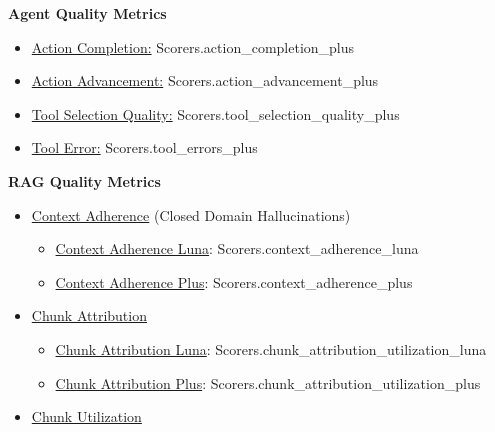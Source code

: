 \documentclass[
  letterpaper,
  DIV=11,
  numbers=noendperiod,
  oneside]{scrreprt}
\begin{document}
\begin{tcolorbox}
\textbf{Agent Quality Metrics}

\begin{itemize}
\item
  \href{https://docs.galileo.ai/galileo/gen-ai-studio-products/galileo-guardrail-metrics/action-completion}{Action
  Completion:} Scorers.action\_completion\_plus
\item
  \href{https://docs.galileo.ai/galileo/gen-ai-studio-products/galileo-guardrail-metrics/action-advancement}{Action
  Advancement:} Scorers.action\_advancement\_plus
\item
  \href{https://docs.galileo.ai/galileo/gen-ai-studio-products/galileo-guardrail-metrics/tool-selection-quality}{Tool
  Selection Quality:} Scorers.tool\_selection\_quality\_plus
\item
  \href{https://docs.galileo.ai/galileo/gen-ai-studio-products/galileo-guardrail-metrics/tool-error}{Tool
  Error:} Scorers.tool\_errors\_plus
\end{itemize}

\textbf{RAG Quality Metrics}

\begin{itemize}
\item
  \href{https://docs.galileo.ai/galileo/gen-ai-studio-products/galileo-guardrail-metrics/context-adherence}{Context
  Adherence} (Closed Domain Hallucinations)

  \begin{itemize}
  \item
    \href{https://docs.galileo.ai/galileo/gen-ai-studio-products/galileo-guardrail-metrics/context-adherence/context-adherence-luna}{Context
    Adherence Luna}: Scorers.context\_adherence\_luna
  \item
    \href{https://docs.galileo.ai/galileo/gen-ai-studio-products/galileo-guardrail-metrics/context-adherence/context-adherence-plus}{Context
    Adherence Plus}: Scorers.context\_adherence\_plus
  \end{itemize}
\item
  \href{https://docs.galileo.ai/galileo/gen-ai-studio-products/galileo-guardrail-metrics/chunk-attribution}{Chunk
  Attribution}

  \begin{itemize}
  \item
    \href{https://docs.galileo.ai/galileo/gen-ai-studio-products/galileo-guardrail-metrics/chunk-attribution/chunk-attribution-luna}{Chunk
    Attribution Luna}: Scorers.chunk\_attribution\_utilization\_luna
  \item
    \href{https://docs.galileo.ai/galileo/gen-ai-studio-products/galileo-guardrail-metrics/chunk-attribution/chunk-attribution-plus}{Chunk
    Attribution Plus}: Scorers.chunk\_attribution\_utilization\_plus
  \end{itemize}
\item
  \href{https://docs.galileo.ai/galileo/gen-ai-studio-products/galileo-guardrail-metrics/chunk-utilization}{Chunk
  Utilization}


\end{itemize}
\end{tcolorbox}
\end{document}
